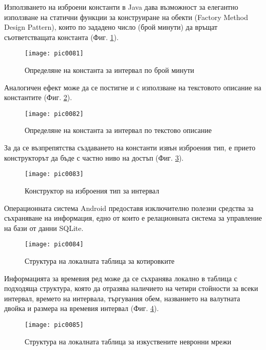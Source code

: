Използването на изброени константи в Java дава възможност за елегантно използване на статични функции за конструиране на обекти (Factory Method Design Pattern), които по зададено число (брой минути) да връщат съответстващата константа (Фиг. \ref{fig:pic0081}).

\begin{figure}[h]
  \centering
  \texttt{[image: pic0081]}
  \caption{Определяне на константа за интервал по брой минути}
\label{fig:pic0081}
\end{figure}
\FloatBarrier

Аналогичен ефект може да се постигне и с използване на текстовото описание на константите (Фиг. \ref{fig:pic0082}).

\begin{figure}[h]
  \centering
  \texttt{[image: pic0082]}
  \caption{Определяне на константа за интервал по текстово описание}
\label{fig:pic0082}
\end{figure}
\FloatBarrier

За да се възпрепятства създаването на константи извън изброения тип, е прието конструкторът да бъде с частно ниво на достъп (Фиг. \ref{fig:pic0083}).

\begin{figure}[h]
  \centering
  \texttt{[image: pic0083]}
  \caption{Конструктор на изброения тип за интервал}
\label{fig:pic0083}
\end{figure}
\FloatBarrier

Операционната система Android предоставя изключително полезни средства за съхраняване на информация, едно от които е релационната система за управление на бази от данни SQLite. 

\begin{figure}[h]
  \centering
  \texttt{[image: pic0084]}
  \caption{Структура на локалната таблица за котировките}
\label{fig:pic0084}
\end{figure}
\FloatBarrier

Информацията за времевия ред може да се съхранява локално в таблица с подходяща структура, която да отразява наличието на четири стойности за всеки интервал, времето на интервала, търгувания обем, названието на валутната двойка и размера на времевия интервал (Фиг. \ref{fig:pic0084}).

\begin{figure}[h]
  \centering
  \texttt{[image: pic0085]}
  \caption{Структура на локалната таблица за изкуствените невронни мрежи}
\label{fig:pic0085}
\end{figure}
\FloatBarrier


